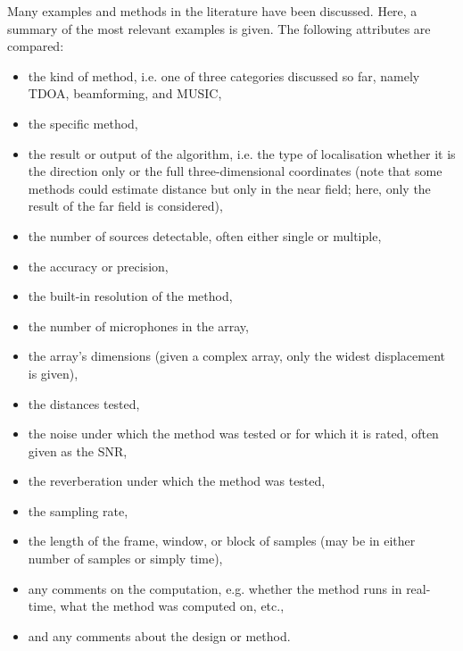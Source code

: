 \documentclass{report}
\begin{document}
Many examples and methods in the literature have been discussed. Here, a summary of the most relevant examples is given. The following attributes are compared:
\begin{itemize}
	\item the kind of method, i.e. one of three categories discussed so far, namely TDOA, beamforming, and MUSIC,
	\item the specific method,
	\item the result or output of the algorithm, i.e. the type of localisation whether it is the direction only or the full three-dimensional coordinates (note that some methods could estimate distance but only in the near field; here, only the result of the far field is considered),
	\item the number of sources detectable, often either single or multiple,
	\item the accuracy or precision,
	\item the built-in resolution of the method,
	\item the number of microphones in the array,
	\item the array's dimensions (given a complex array, only the widest displacement is given),
	\item the distances tested,
	\item the noise under which the method was tested or for which it is rated, often given as the SNR,
	\item the reverberation under which the method was tested,
	\item the sampling rate,
	\item the length of the frame, window, or block of samples (may be in either number of samples or simply time),
	\item any comments on the computation, e.g. whether the method runs in real-time, what the method was computed on, etc.,
	\item and any comments about the design or method.
\end{itemize}
\end{document}
